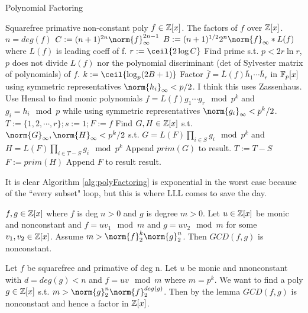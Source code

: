 \begin{algorithm}                      
\caption{Polynomial Factoring}
\label{alg:polyFactoring}
\begin{algorithmic}                    
\REQUIRE Squarefree primative non-constant poly $f \in \mathbb Z[x]$.
\ENSURE The  factors of $f$ over  $\mathbb Z[x]$.
\STATE $n=deg(f)$
\STATE $C:=(n+1)^{2n} \norm{f}_\infty^{2n-1}$
\STATE $B:=(n+1)^{1/2}2^n\norm{f}_\infty*L(f)$  where  $L(f)$  is leading coeff  of f.
\STATE $r:= \ceil{2 \log C}$
\STATE Find prime s.t.  $p  < 2r \ln r$, $p$  does not  divide $L(f)$ nor the polynomial discriminant (det of Sylvester matrix of polynomials)  of $f$.
\STATE $k:=\ceil{\log_p (2B+1)}$
\STATE Factor  $\bar  f  = \bar L(f) \bar  h_1 \cdots \bar h_r $  in $\mathbb F_p[x]$  using symmetric  representatives $\norm{h_i}_\infty <  p/2$. I think this  uses  Zassenhaus.
\STATE Use  Hensal  to find monic polynomials $f=L(f)g_1 \cdots g_r  \mod p^k$   and $g_i=h_i  \mod  p$  while 
using symmetric representatives $\norm{g_i}_\infty  <  p^k/2$.
\STATE $T:=\{1,2,\cdots,r\};  s:=1; F:=f$
		\STATE Find $G,H \in \mathbb Z[x]$  s.t.  $\norm{G}_\infty,  \norm{H}_\infty  < p^k/2$
		\STATE s.t. $G = L(F) \prod\limits_{i\in S} g_i  \mod  p^k$
		\STATE and  $H = L(F) \prod\limits_{i\in  T - S} g_i \mod p^k$
			\STATE Append  $prim(G)$ to result.
			\STATE $T:=T-S$
			\STATE $F:=prim(H)$
		\ENDIF
	\ENDFOR
\ENDWHILE
\STATE Append $F$ to  result
\RETURN result.
\end{algorithmic}
\end{algorithm}

It is clear Algorithm \ref{alg:polyFactoring} is exponential in the  worst  case because of the  ``every subset" loop, but  this is  where  LLL comes to save the day.

\begin{theorem}
	$f,g  \in  \mathbb Z[x]$ where $f$ is deg  $n > 0$ and $g$  is  degree  $m  > 0$. Let $u \in \mathbb Z[x]$ be monic  and   nonconstant  and  $f = uv_1 \mod  m$ and  $g=uv_2 \mod m$ for  some $v_1,  v_2 \in \mathbb Z[x]$. Assume $m > \norm{f}^k_2\norm{g}^n_2$. Then $GCD(f,g)$ is nonconstant.
\end{theorem}


Let $f$  be squarefree and primative of deg n. Let  $u$ be  monic and  nnonconstant  with  $d=deg(g) < n$  and  $f=uv \mod  m$ where  $m=p^k$. We want to find a poly $g  \in  \mathbb Z[x]$  s.t. $m  >  \norm{g}_2^n\norm{f}_2^{deg(g)}$. Then by the lemma $GCD(f,g)$ is nonconstant and hence a factor in $\mathbb Z[x]$.

